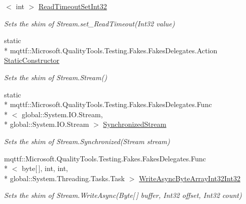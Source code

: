 \begin{DoxyCompactItemize}
$<$ int $>$ \hyperlink{class_system_1_1_i_o_1_1_fakes_1_1_shim_stream_a3f10ce7d67c1f77260b5efcd05c23964}{Read\-Timeout\-Set\-Int32}
\begin{DoxyCompactList}\small\item\em Sets the shim of Stream.\-set\-\_\-\-Read\-Timeout(\-Int32 value)\end{DoxyCompactList}\item 
static \\*
mqttf\-::\-Microsoft.\-Quality\-Tools.\-Testing.\-Fakes.\-Fakes\-Delegates.\-Action \hyperlink{class_system_1_1_i_o_1_1_fakes_1_1_shim_stream_a392efc485c290517b93519d79d4e4845}{Static\-Constructor}
\begin{DoxyCompactList}\small\item\em Sets the shim of Stream.\-Stream()\end{DoxyCompactList}\item 
static \\*
mqttf\-::\-Microsoft.\-Quality\-Tools.\-Testing.\-Fakes.\-Fakes\-Delegates.\-Func\\*
$<$ global\-::\-System.\-I\-O.\-Stream, \\*
global\-::\-System.\-I\-O.\-Stream $>$ \hyperlink{class_system_1_1_i_o_1_1_fakes_1_1_shim_stream_a07a164a37ca7b4ef13e78b9e175367e1}{Synchronized\-Stream}
\begin{DoxyCompactList}\small\item\em Sets the shim of Stream.\-Synchronized(\-Stream stream)\end{DoxyCompactList}\item 
mqttf\-::\-Microsoft.\-Quality\-Tools.\-Testing.\-Fakes.\-Fakes\-Delegates.\-Func\\*
$<$ byte\mbox{[}$\,$\mbox{]}, int, int, \\*
global\-::\-System.\-Threading.\-Tasks.\-Task $>$ \hyperlink{class_system_1_1_i_o_1_1_fakes_1_1_shim_stream_af7d9dd8a6ad6416c612b59e53ef47042}{Write\-Async\-Byte\-Array\-Int32\-Int32}
\begin{DoxyCompactList}\small\item\em Sets the shim of Stream.\-Write\-Async(\-Byte\mbox{[}$\,$\mbox{]} buffer, Int32 offset, Int32 count)\end{DoxyCompactList}\item 

\end{DoxyCompactItemize}

